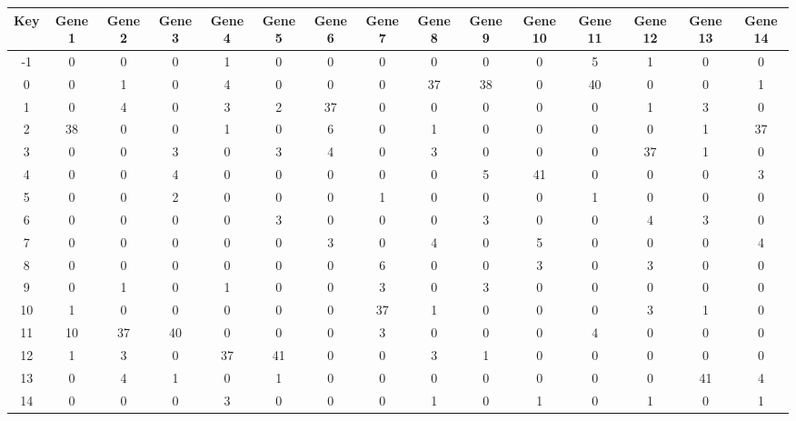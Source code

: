 \begin{tabular}{|c|c|c|c|c|c|c|c|c|c|c|c|c|c|c|}
\hline
Key & Gene 1 & Gene 2 & Gene 3 & Gene 4 & Gene 5 & Gene 6 & Gene 7 & Gene 8 & Gene 9 & Gene 10 & Gene 11 & Gene 12 & Gene 13 & Gene 14 \\
\hline
-1 & 0 & 0 & 0 & 1 & 0 & 0 & 0 & 0 & 0 & 0 & 5 & 1 & 0 & 0 \\
0 & 0 & 1 & 0 & 4 & 0 & 0 & 0 & 37 & 38 & 0 & 40 & 0 & 0 & 1 \\
1 & 0 & 4 & 0 & 3 & 2 & 37 & 0 & 0 & 0 & 0 & 0 & 1 & 3 & 0 \\
2 & 38 & 0 & 0 & 1 & 0 & 6 & 0 & 1 & 0 & 0 & 0 & 0 & 1 & 37 \\
3 & 0 & 0 & 3 & 0 & 3 & 4 & 0 & 3 & 0 & 0 & 0 & 37 & 1 & 0 \\
4 & 0 & 0 & 4 & 0 & 0 & 0 & 0 & 0 & 5 & 41 & 0 & 0 & 0 & 3 \\
5 & 0 & 0 & 2 & 0 & 0 & 0 & 1 & 0 & 0 & 0 & 1 & 0 & 0 & 0 \\
6 & 0 & 0 & 0 & 0 & 3 & 0 & 0 & 0 & 3 & 0 & 0 & 4 & 3 & 0 \\
7 & 0 & 0 & 0 & 0 & 0 & 3 & 0 & 4 & 0 & 5 & 0 & 0 & 0 & 4 \\
8 & 0 & 0 & 0 & 0 & 0 & 0 & 6 & 0 & 0 & 3 & 0 & 3 & 0 & 0 \\
9 & 0 & 1 & 0 & 1 & 0 & 0 & 3 & 0 & 3 & 0 & 0 & 0 & 0 & 0 \\
10 & 1 & 0 & 0 & 0 & 0 & 0 & 37 & 1 & 0 & 0 & 0 & 3 & 1 & 0 \\
11 & 10 & 37 & 40 & 0 & 0 & 0 & 3 & 0 & 0 & 0 & 4 & 0 & 0 & 0 \\
12 & 1 & 3 & 0 & 37 & 41 & 0 & 0 & 3 & 1 & 0 & 0 & 0 & 0 & 0 \\
13 & 0 & 4 & 1 & 0 & 1 & 0 & 0 & 0 & 0 & 0 & 0 & 0 & 41 & 4 \\
14 & 0 & 0 & 0 & 3 & 0 & 0 & 0 & 1 & 0 & 1 & 0 & 1 & 0 & 1 \\
\hline
\end{tabular}